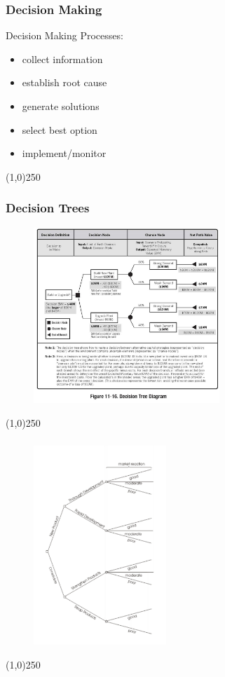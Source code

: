 \begin{frame}
\frametitle{Decision Making}
Decision Making Processes: 
\begin{itemize}
\item collect information
\item establish root cause
\item generate solutions
\item select best option
\item implement/monitor
\end{itemize}
\end{frame}\begin{center}\line(1,0){250}\end{center}





\begin{frame}
\frametitle{Decision Trees}
\begin{figure}
	\centering
		\includegraphics[width = 7cm]{images/Fig11-16.jpg}
	\label{fig:11-16}
\end{figure}
\end{frame}\begin{center}\line(1,0){250}\end{center}






\begin{frame}
\frametitle{}
\begin{figure}
	\centering
		\includegraphics[width = 5cm]{images/evmtree2.jpg}
	\label{fig:tree1}
\end{figure}
\end{frame}\begin{center}\line(1,0){250}\end{center}






